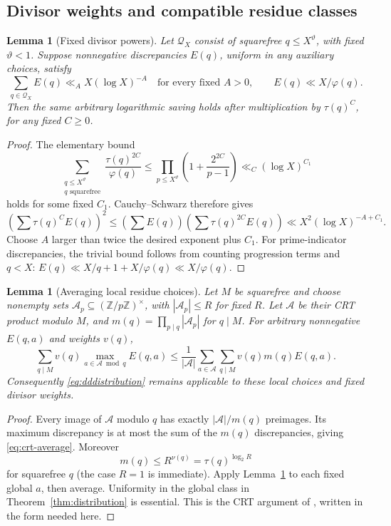 \documentclass[11pt,a4paper]{article}
\newtheorem{lemma}[theorem]{Lemma}
\theoremstyle{definition}\newtheorem{definition}[theorem]{Definition}
\theoremstyle{remark}\newtheorem{remark}[theorem]{Remark}
\numberwithin{equation}{section}
\begin{document}
\subsection{Divisor weights and compatible residue classes}
\begin{lemma}[Fixed divisor powers]\label{lem:divisor-weight}
Let $\mathcal Q_X$ consist of squarefree $q\le X^\vartheta$, with fixed $\vartheta<1$. Suppose nonnegative discrepancies $E(q)$, uniform in any auxiliary choices, satisfy
\[
 \sum_{q\in\mathcal Q_X}E(q)\ll_A X(\log X)^{-A}
 \quad\text{for every fixed }A>0,
 \qquad E(q)\ll X/\varphi(q).
\]
Then the same arbitrary logarithmic saving holds after multiplication by $\tau(q)^C$, for any fixed $C\ge0$.
\end{lemma}
\begin{proof}
The elementary bound
\[
 \sum_{\substack{q\le X^\vartheta\\q\text{ squarefree}}}
 \frac{\tau(q)^{2C}}{\varphi(q)}
 \le\prod_{p\le X^\vartheta}\left(1+\frac{2^{2C}}{p-1}\right)
 \ll_C (\log X)^{C_1}
\]
holds for some fixed $C_1$. Cauchy--Schwarz therefore gives
\[
 \left(\sum\tau(q)^CE(q)\right)^2
 \le\left(\sum E(q)\right)\left(\sum\tau(q)^{2C}E(q)\right)
 \ll X^2(\log X)^{-A+C_1}.
\]
Choose $A$ larger than twice the desired exponent plus $C_1$. For prime-indicator discrepancies, the trivial bound follows from counting progression terms and $q<X$: $E(q)\ll X/q+1+X/\varphi(q)\ll X/\varphi(q)$.
\end{proof}

\begin{lemma}[Averaging local residue choices]\label{lem:crt-average}
Let $M$ be squarefree and choose nonempty sets $\mathcal A_p\subseteq(\mathbb Z/p\mathbb Z)^\times$, with $|\mathcal A_p|\le R$ for fixed $R$. Let $\mathcal A$ be their CRT product modulo $M$, and $m(q)=\prod_{p\mid q}|\mathcal A_p|$ for $q\mid M$. For arbitrary nonnegative $E(q,a)$ and weights $v(q)$,
\begin{equation}\label{eq:crt-average}
 \sum_{q\mid M}v(q)\max_{a\in\mathcal A\bmod q}E(q,a)
 \le\frac1{|\mathcal A|}\sum_{a\in\mathcal A}
       \sum_{q\mid M}v(q)m(q)E(q,a).
\end{equation}
Consequently \eqref{eq:dddistribution} remains applicable to these local choices and fixed divisor weights.
\end{lemma}
\begin{proof}
Every image of $\mathcal A$ modulo $q$ has exactly $|\mathcal A|/m(q)$ preimages. Its maximum discrepancy is at most the sum of the $m(q)$ discrepancies, giving \eqref{eq:crt-average}. Moreover
\[
 m(q)\le R^{\nu(q)}=\tau(q)^{\log_2 R}
\]
for squarefree $q$ (the case $R=1$ is immediate). Apply Lemma~\ref{lem:divisor-weight} to each fixed global $a$, then average. Uniformity in the global class in Theorem~\ref{thm:distribution} is essential. This is the CRT argument of \cite[Proposition~2.14]{shortgaps}, written in the form needed here.
\end{proof}
\end{document}
